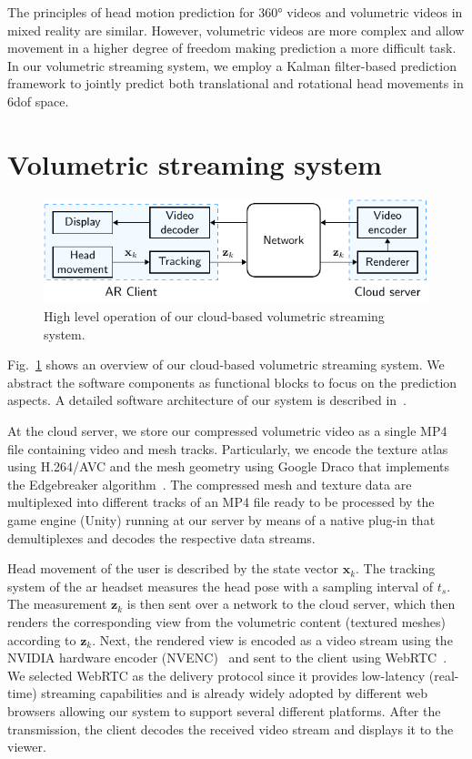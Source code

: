 \documentclass[sigconf]{acmart}			%
\begin{document}
The principles of head motion prediction for \ang{360} videos and volumetric videos in mixed reality are similar. 
However, volumetric videos are more complex and allow movement in a higher degree of freedom making prediction a more difficult task.
In our volumetric streaming system, we employ a Kalman filter-based prediction framework to jointly predict both translational and rotational head movements in \gls{6dof} space.

\section{Volumetric streaming system}
\label{sec:system}
\begin{figure}[t]
	\includegraphics[width=\linewidth]{system_baseline.pdf}
	\caption[System model]{High level operation of our cloud-based volumetric streaming system.}
	\label{fig:system_baseline}
\end{figure}

Fig.~\ref{fig:system_baseline} shows an overview of our cloud-based volumetric streaming system. 
We abstract the software components as functional blocks to focus on the prediction aspects.
A detailed software architecture of our system is described in~\cite{guel2020a}.

At the cloud server, we store our compressed volumetric video as a single MP4 file containing video and mesh tracks. 
Particularly, we encode the texture atlas using H.264/AVC and the mesh geometry using  Google Draco that implements the Edgebreaker algorithm~\cite{rossignac1999}.
The compressed mesh and texture data are multiplexed into different tracks of an MP4 file ready to be processed by the game engine (Unity) running at our server by means of a native plug-in that demultiplexes and decodes the respective data streams.

Head movement of the user is described by the state vector $\mathbf{x}_k$.
The tracking system of the \gls{ar} headset measures the head pose with a sampling interval of $t_s$. 
The measurement $\mathbf{z}_k$ is then sent over a network to the cloud server, which then renders the corresponding view from the volumetric content (textured meshes) according to $\mathbf{z}_k$.
Next, the rendered view is encoded as a video stream using the NVIDIA hardware encoder (NVENC)~\cite{nvidia2019} and sent to the client using WebRTC~\cite{webrtc}. 
We selected WebRTC as the delivery protocol since it provides low-latency (real-time) streaming capabilities and is already widely adopted by different web browsers allowing our system to support several different platforms.
After the transmission, the client decodes the received video stream and displays it to the viewer.
\end{document}
